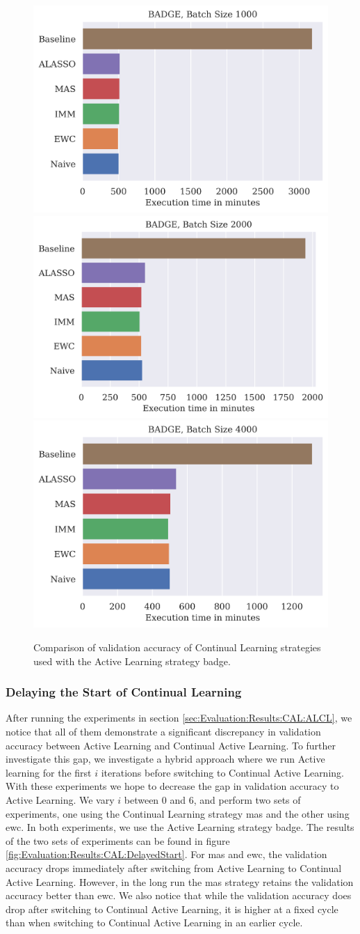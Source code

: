 \begin{figure}[h]
    \centering
    \includegraphics[width=0.32\linewidth]{images/results_CAL/badge_1000b_time.png} \hfill
    \includegraphics[width=0.32\linewidth]{images/results_CAL/badge_2000b_time.png} \hfill
    \includegraphics[width=0.32\linewidth]{images/results_CAL/badge_4000b_time.png}
    \caption[Continual Active Learning with \gls{badge} with varying batch size]{Comparison of validation accuracy of Continual Learning strategies used with the Active Learning strategy
    \gls{badge}.}
    \label{fig:Evaluation:Results:CAL:VaryBatchSizeTime}
\end{figure}

\subsubsection{Delaying the Start of Continual Learning}
\label{sec:Evaluation:Results:CAL:Hybrid}
After running the experiments in section \ref{sec:Evaluation:Results:CAL:ALCL}, we notice that all of them demonstrate a significant discrepancy in validation accuracy between Active Learning and Continual Active Learning. To further investigate this gap,
we investigate a hybrid approach where we run Active learning for the first $i$ iterations before switching to Continual Active Learning. With these experiments we hope to decrease the gap in validation accuracy to Active Learning. We vary $i$ between 0 and 6,
and perform two sets of experiments, one using the Continual Learning strategy \gls{mas} and the other using \gls{ewc}. In both experiments, we use the Active Learning strategy \gls{badge}. The results of the two sets of experiments can be found in figure 
\ref{fig:Evaluation:Results:CAL:DelayedStart}. For \gls{mas} and \gls{ewc}, the validation accuracy drops immediately after switching from Active Learning to Continual Active Learning. However, in the long run the \gls{mas} strategy retains the validation accuracy better than \gls{ewc}.
We also notice that while the validation accuracy does drop after switching to Continual Active Learning, it is higher at a fixed cycle than when switching to Continual Active Learning in an earlier cycle. \par

